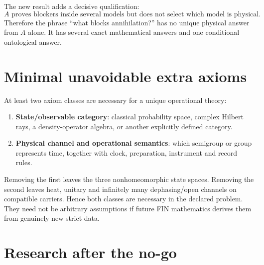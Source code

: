 \documentclass[11pt,a4paper]{article}
\begin{document}
The new result adds a decisive qualification:
\[
 \boxed{A\text{ proves blockers inside several models but does not select which
 model is physical.}}
\]
Therefore the phrase ``what blocks annihilation?'' has no unique physical
answer from $A$ alone.  It has several exact mathematical answers and one
conditional ontological answer.

\section{Minimal unavoidable extra axioms}

At least two axiom classes are necessary for a unique operational theory:
\begin{enumerate}
\item \textbf{State/observable category}: classical probability space,
      complex Hilbert rays, a density-operator algebra, or another explicitly
      defined category.
\item \textbf{Physical channel and operational semantics}: which semigroup or
      group represents time, together with clock, preparation, instrument and
      record rules.
\end{enumerate}
Removing the first leaves the three nonhomeomorphic state spaces.  Removing
the second leaves heat, unitary and infinitely many dephasing/open channels on
compatible carriers.  Hence both classes are necessary in the declared
problem.  They need not be arbitrary assumptions if future FIN mathematics
derives them from genuinely new strict data.

\section{Research after the no-go}
\end{document}
